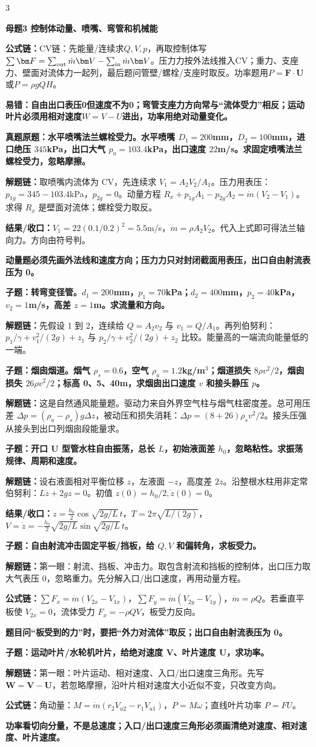 \documentclass[a4paper]{article}
\newcommand{\mt}[1]{\vspace{0.12pt}\colorbox{M}{\parbox{\dimexpr\linewidth-2\fboxsep}{\color{white}\bfseries #1}}\par}
\newcommand{\qt}[1]{\vspace{0.04pt}\colorbox{Q}{\parbox{\dimexpr\linewidth-2\fboxsep}{\color{white}\bfseries #1}}\par}
\newcommand{\warn}[1]{\colorbox{Y}{\parbox{\dimexpr\linewidth-2\fboxsep}{\color{E}\bfseries #1}}\par}
\newcommand{\chain}[1]{{\color{A}\bfseries 解题链：}#1\par}
\newcommand{\res}[1]{{\color{E}\bfseries 结果/收口：}#1\par}
\newcommand{\form}[1]{{\color{M}\bfseries 公式链：}#1\par}
\begin{document}
\begin{multicols}{3}
\mt{母题3 控制体动量、喷嘴、弯管和机械能}
\form{CV链：先能量/连续求$Q,V,p$，再取控制体写$\sum\bm F=\sum_{\rm out}\dot m\bm V-\sum_{\rm in}\dot m\bm V$。压力力按外法线推入CV；重力、支座力、壁面对流体力一起列，最后题问管壁/螺栓/支座时取反。功率题用$P=\bm F\cdot\bm U$或$P=\rho gQH$。}
\warn{易错：自由出口表压0但速度不为0；弯管支座力方向常与“流体受力”相反；运动叶片必须用相对速度$W=V-U$进出，功率用绝对动量变化。}
\qt{真题原题：水平喷嘴法兰螺栓受力。水平喷嘴 $D_1=200$mm，$D_2=100$mm，进口绝压 $345$kPa，出口大气 $p_a=103.4$kPa，出口速度 $22$m/s。求固定喷嘴法兰螺栓受力，忽略摩擦。}
\chain{取喷嘴内流体为 CV，先连续求 $V_1=A_2V_2/A_1$。压力用表压：$p_{1g}=345-103.4$kPa，$p_{2g}=0$。动量方程 $R_x+p_{1g}A_1-p_{2g}A_2=\dot m(V_2-V_1)$。求得 $R_x$ 是壁面对流体；螺栓受力取反。}
\res{$V_1=22(0.1/0.2)^2=5.5$m/s，$\dot m=\rho A_2V_2$。代入上式即可得法兰轴向力。方向由符号判。}
\warn{动量题必须先画外法线和速度方向；压力力只对封闭截面用表压，出口自由射流表压为 0。}

\qt{子题：转弯变径管。$d_1=200$mm，$p_1=70$kPa；$d_2=400$mm，$p_2=40$kPa，$v_2=1$m/s，高差 $z=1$m。求流量和方向。}
\chain{先假设 1 到 2，连续给 $Q=A_2v_2$ 与 $v_1=Q/A_1$。再列伯努利：$p_1/\gamma+v_1^2/(2g)+z_1$ 与 $p_2/\gamma+v_2^2/(2g)+z_2$ 比较。能量高的一端流向能量低的一端。}

\qt{子题：烟囱烟道。烟气 $\rho_s=0.6$，空气 $\rho_a=1.2$kg/m$^3$；烟道损失 $8\rho v^2/2$，烟囱损失 $26\rho v^2/2$；标高 0、5、40m，求烟囱出口速度 $v$ 和接头静压 $p$。}
\chain{这是自然通风能量题。驱动力来自外界空气柱与烟气柱密度差。总可用压差 $\Delta p=(\rho_a-\rho_s)g\Delta z$，被动压和损失消耗：$\Delta p=(8+26)\rho_s v^2/2$。接头压强从接头到出口列烟囱段能量求。}

\qt{子题：开口 U 型管水柱自由振荡，总长 $L$，初始液面差 $h_0$，忽略粘性。求振荡规律、周期和速度。}
\chain{设右液面相对平衡位移 $z$，左液面 $-z$，高度差 $2z$。沿整根水柱用非定常伯努利：$L\ddot z+2gz=0$。初值 $z(0)=h_0/2,\dot z(0)=0$。}
\res{$z=\frac{h_0}{2}\cos\sqrt{2g/L}\,t$，$T=2\pi\sqrt{L/(2g)}$，$V=\dot z=-\frac{h_0}{2}\sqrt{2g/L}\sin\sqrt{2g/L}\,t$。}

\qt{子题：自由射流冲击固定平板/挡板，给 $Q,V$ 和偏转角，求板受力。}
\chain{第一眼：射流、挡板、冲击力。取包含射流和挡板的控制体，出口压力取大气表压 0，忽略重力。先分解入口/出口速度，再用动量方程。}
\form{$\sum F_x=\dot m(V_{2x}-V_{1x})$，$\sum F_y=\dot m(V_{2y}-V_{1y})$，$\dot m=\rho Q$。若垂直平板使 $V_{2x}=0$，流体受力 $F_x=-\rho QV$，板受力反向。}
\warn{题目问“板受到的力”时，要把“外力对流体”取反；出口自由射流表压为 0。}

\qt{子题：运动叶片/水轮机叶片，给绝对速度 $\bm V$、叶片速度 $\bm U$，求功率。}
\chain{第一眼：叶片运动、相对速度、入口/出口速度三角形。先写 $\bm W=\bm V-\bm U$，若忽略摩擦，沿叶片相对速度大小近似不变，只改变方向。}
\form{角动量：$M=\dot m(r_2V_{u2}-r_1V_{u1})$，$P=M\omega$；直线叶片功率 $P=FU$。}
\warn{功率看切向分量，不是总速度；入口/出口速度三角形必须画清绝对速度、相对速度、叶片速度。}


\end{multicols}
\end{document}
